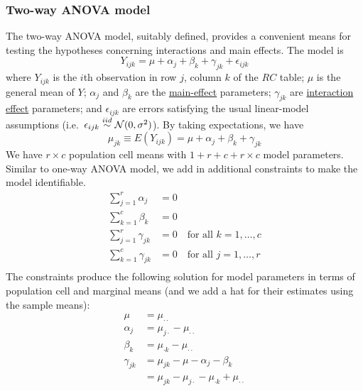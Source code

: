 \subsubsection*{Two-way ANOVA model}
The two-way ANOVA model, suitably defined, provides a convenient means for testing the hypotheses concerning interactions and main effects.
The model is
$$
Y_{ijk} = \mu + \alpha_j + \beta_k + \gamma_{jk} + \epsilon_{ijk}
$$
where $Y_{ijk}$ is the $i$th observation in row $j$, column $k$ of the $RC$ table; $\mu$ is the general mean of $Y$; $\alpha_j$ and $\beta_k$ are the \underline{main-effect} parameters; $\gamma_{jk}$ are \underline{interaction effect} parameters; and $\epsilon_{ijk}$ are errors satisfying the usual linear-model assumptions (i.e.~$\epsilon_{ijk} \overset{iid}{\sim} \mathcal{N}(0, \sigma^2)$).
By taking expectations, we have
$$
\mu_{jk} \equiv \textit{E}(Y_{ijk}) = \mu + \alpha_j + \beta_k + \gamma_{jk}
$$
We have $r \times c$ population cell means with $1 + r + c + r \times c$ model parameters.
Similar to one-way ANOVA model, we add in additional constraints to make the model identifiable.
$$
\begin{aligned}
	\sum\limits_{j = 1}^ r \alpha_j &= 0\\
	\sum\limits_{k = 1}^c \beta_k &= 0\\
	\sum\limits_{j = 1}^ r \gamma_{jk} &= 0 \quad \mbox{for all } k = 1, \dots, c\\
	\sum\limits_{k = 1}^c \gamma_{jk} &= 0 \quad \mbox{for all } j = 1, \dots, r\\
\end{aligned}
$$
The constraints produce the following solution for model parameters in terms of population cell and marginal means (and we add a hat for their estimates using the sample means):
$$
\begin{aligned}
	\mu &= \mu_{\cdot \cdot}\\
	\alpha_j &= \mu_{j \cdot} - \mu_{\cdot \cdot}\\
	\beta_k &= \mu_{\cdot k} - \mu_{\cdot \cdot} \\
	\gamma_{jk} &= \mu_{jk} - \mu - \alpha_j  - \beta_k \\
	&= \mu_{jk} - \mu_{j\cdot} - \mu_{\cdot k} + \mu_{\cdot \cdot}\\
\end{aligned}
$$

